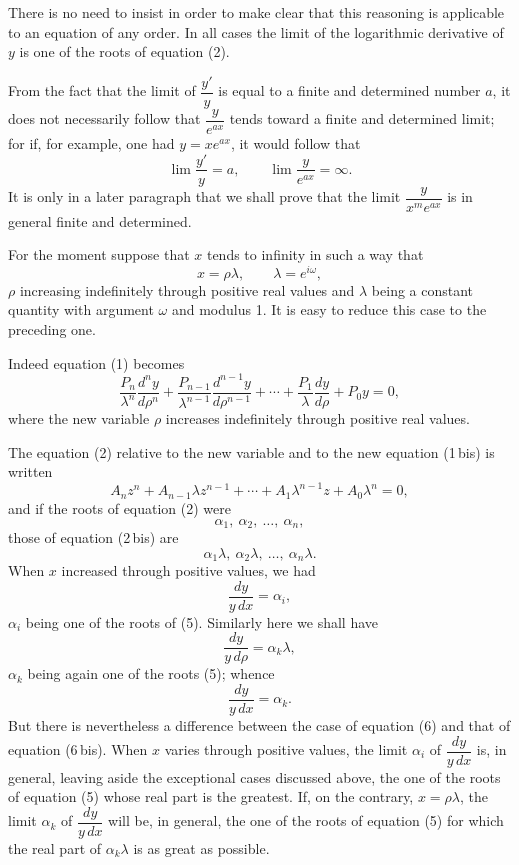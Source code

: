 \documentclass[11pt]{article}
\begin{document}
There is no need to insist in order to make clear that this reasoning is applicable to an equation of any order. In all cases the limit of the logarithmic derivative of $y$ is one of the roots of equation (2).

From the fact that the limit of $\dfrac{y'}{y}$ is equal to a finite and determined number $a$, it does not necessarily follow that $\dfrac{y}{e^{ax}}$ tends toward a finite and determined limit; for if, for example, one had $y=xe^{ax}$, it would follow that
\[
\lim\frac{y'}{y}=a,
\qquad
\lim\frac{y}{e^{ax}}=\infty.
\]
It is only in a later paragraph that we shall prove that the limit $\dfrac{y}{x^m e^{ax}}$ is in general finite and determined.

For the moment suppose that $x$ tends to infinity in such a way that
\[
x=\rho\lambda,
\qquad
\lambda=e^{i\omega},
\]
$\rho$ increasing indefinitely through positive real values and $\lambda$ being a constant quantity with argument $\omega$ and modulus 1. It is easy to reduce this case to the preceding one.

Indeed equation (1) becomes
\[
\tag{1\,bis}
\frac{P_n}{\lambda^n}\frac{d^ny}{d\rho^n}+\frac{P_{n-1}}{\lambda^{n-1}}\frac{d^{n-1}y}{d\rho^{n-1}}+\cdots+\frac{P_1}{\lambda}\frac{dy}{d\rho}+P_0y=0,
\]
where the new variable $\rho$ increases indefinitely through positive real values.

The equation (2) relative to the new variable and to the new equation (1\,bis) is written
\[
\tag{2\,bis}
A_nz^n+A_{n-1}\lambda z^{n-1}+\cdots+A_1\lambda^{n-1}z+A_0\lambda^n=0,
\]
and if the roots of equation (2) were
\[
\tag{5}
\alpha_1,\ \alpha_2,\ \ldots,\ \alpha_n,
\]
those of equation (2\,bis) are
\[
\alpha_1\lambda,\ \alpha_2\lambda,\ \ldots,\ \alpha_n\lambda.
\]
When $x$ increased through positive values, we had
\[
\tag{6}
\frac{dy}{y\,dx}=\alpha_i,
\]
$\alpha_i$ being one of the roots of (5). Similarly here we shall have
\[
\frac{dy}{y\,d\rho}=\alpha_k\lambda,
\]
$\alpha_k$ being again one of the roots (5); whence
\[
\tag{6\,bis}
\frac{dy}{y\,dx}=\alpha_k.
\]
But there is nevertheless a difference between the case of equation (6) and that of equation (6\,bis). When $x$ varies through positive values, the limit $\alpha_i$ of $\dfrac{dy}{y\,dx}$ is, in general, leaving aside the exceptional cases discussed above, the one of the roots of equation (5) whose real part is the greatest. If, on the contrary, $x=\rho\lambda$, the limit $\alpha_k$ of $\dfrac{dy}{y\,dx}$ will be, in general, the one of the roots of equation (5) for which the real part of $\alpha_k\lambda$ is as great as possible.
\end{document}
